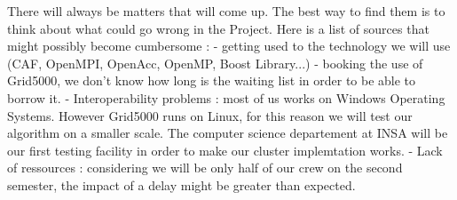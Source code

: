 There will always be matters that will come up. The best way to find them is to think about what could go wrong in the Project.
Here is a list of sources that might possibly become cumbersome :
- getting used to the technology we will use (CAF, OpenMPI, OpenAcc, OpenMP, Boost Library...)
- booking the use of Grid5000, we don't know how long is the waiting list in order to be able to borrow it.
- Interoperability problems : most of us works on Windows Operating Systems. However Grid5000 runs on Linux, for this reason we will test our algorithm on a smaller scale. The computer science departement at INSA will be our first testing facility in order to make our cluster implemtation works.
- Lack of ressources : considering we will be only half of our crew on the second semester, the impact of a delay might be greater than expected.
